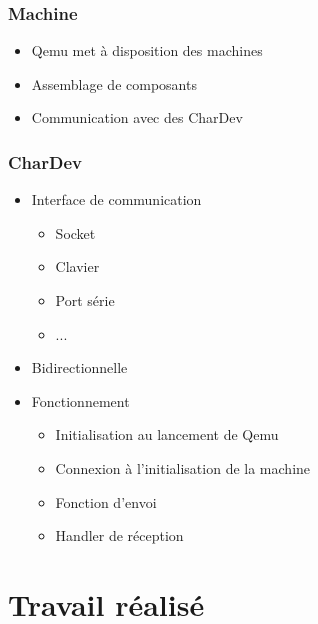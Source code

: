 \documentclass{beamer}
\begin{document}
			\begin{frame}
				\frametitle{Machine}
				\begin{itemize}
					\item Qemu met à disposition des machines
					\item Assemblage de composants
					\item Communication avec des CharDev
				\end{itemize}
			\end{frame}
			
			\begin{frame}
				\frametitle{CharDev}
				\begin{itemize}
					\item Interface de communication
						\begin{itemize}
							\item Socket
							\item Clavier
							\item Port série
							\item ...
						\end{itemize}
					\item Bidirectionnelle
					\item Fonctionnement
						\begin{itemize}
							\item Initialisation au lancement de Qemu
							\item Connexion à l'initialisation de la machine
							\item Fonction d'envoi
							\item Handler de réception
						\end{itemize}
				\end{itemize}
			\end{frame}
			
			
			
	\section{Travail réalisé}
\end{document}

